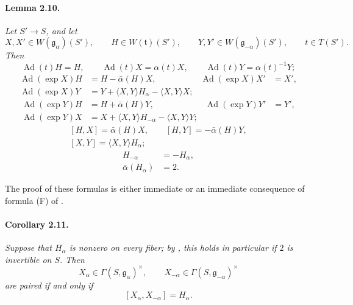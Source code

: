 \paragraph{\textbf{Lemma 2.10.}}
\emph{Let \(S'\to S\), and let}
\[
  X,X'\in W(\mathfrak g_\alpha)(S'),\qquad
  H\in W(\mathfrak t)(S'),\qquad
  Y,Y'\in W(\mathfrak g_{-\alpha})(S'),\qquad
  t\in T(S').
\]
\emph{Then}
\[
\tag{1}\label{sga3:xx:lemma:2-10:equation:1}
  \operatorname{Ad}(t)H=H,\qquad
  \operatorname{Ad}(t)X=\alpha(t)X,\qquad
  \operatorname{Ad}(t)Y=\alpha(t)^{-1}Y;
\]
\[
  \tag{2}\label{sga3:xx:lemma:2-10:equation:2}
\begin{aligned}
  \operatorname{Ad}(\exp X)H
    &=H-\bar\alpha(H)X,&
  \operatorname{Ad}(\exp X)X'&=X',\\
  \operatorname{Ad}(\exp X)Y
    &=Y+\langle X,Y\rangle H_\alpha
        -\langle X,Y\rangle X;
\end{aligned}
\]
\[
  \tag{2'}\label{sga3:xx:lemma:2-10:equation:2-prime}
\begin{aligned}
  \operatorname{Ad}(\exp Y)H
    &=H+\bar\alpha(H)Y,&
  \operatorname{Ad}(\exp Y)Y'&=Y',\\
  \operatorname{Ad}(\exp Y)X
    &=X+\langle X,Y\rangle H_{-\alpha}
        -\langle X,Y\rangle Y;
\end{aligned}
\]
\[
\tag{3}\label{sga3:xx:lemma:2-10:equation:3}
\begin{gathered}
  [H,X]=\bar\alpha(H)X,\qquad
  [H,Y]=-\bar\alpha(H)Y,\\
  [X,Y]=\langle X,Y\rangle H_\alpha;
\end{gathered}
\]
\begin{align}
  H_{-\alpha}&=-H_\alpha, \tag{4}\label{sga3:xx:lemma:2-10:equation:4}\\
  \bar\alpha(H_\alpha)&=2. \tag{5}\label{sga3:xx:lemma:2-10:equation:5}
\end{align}

The proof of these formulas is either immediate or an immediate
consequence of formula \textup{(F)} of .

\paragraph{\textbf{Corollary 2.11.}}
\emph{Suppose that \(H_\alpha\) is nonzero on every fiber; by
\textup{}, this holds in particular if \(2\) is invertible on
\(S\). Then}
\[
  X_\alpha\in\Gamma(S,\mathfrak g_\alpha)^\times,\qquad
  X_{-\alpha}\in\Gamma(S,\mathfrak g_{-\alpha})^\times
\]
\emph{are paired if and only if}
\[
  [X_\alpha,X_{-\alpha}]=H_\alpha.
\]

